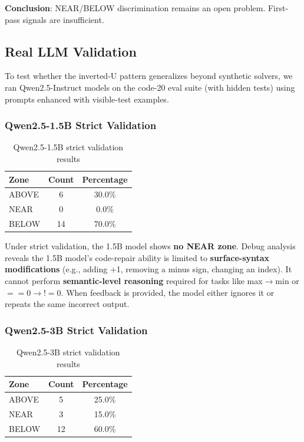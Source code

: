 \documentclass[11pt,a4paper]{article}
\begin{document}
\textbf{Conclusion}: NEAR/BELOW discrimination remains an open problem. First-pass signals are insufficient.

\subsection{Real LLM Validation}

To test whether the inverted-U pattern generalizes beyond synthetic solvers, we ran Qwen2.5-Instruct models on the code-20 eval suite (with hidden tests) using prompts enhanced with visible-test examples.

\subsubsection{Qwen2.5-1.5B Strict Validation}

\begin{table}[h]
\centering
\begin{tabular}{lcc}
\toprule
\textbf{Zone} & \textbf{Count} & \textbf{Percentage} \\
\midrule
ABOVE & 6 & 30.0\% \\
NEAR & 0 & 0.0\% \\
BELOW & 14 & 70.0\% \\
\bottomrule
\end{tabular}
\caption{Qwen2.5-1.5B strict validation results}
\label{tab:1.5b}
\end{table}

Under strict validation, the 1.5B model shows \textbf{no NEAR zone}. Debug analysis reveals the 1.5B model's code-repair ability is limited to \textbf{surface-syntax modifications} (e.g., adding +1, removing a minus sign, changing an index). It cannot perform \textbf{semantic-level reasoning} required for tasks like max$\rightarrow$min or $==0 \rightarrow !=0$. When feedback is provided, the model either ignores it or repeats the same incorrect output.

\subsubsection{Qwen2.5-3B Strict Validation}

\begin{table}[h]
\centering
\begin{tabular}{lcc}
\toprule
\textbf{Zone} & \textbf{Count} & \textbf{Percentage} \\
\midrule
ABOVE & 5 & 25.0\% \\
NEAR & 3 & 15.0\% \\
BELOW & 12 & 60.0\% \\
\bottomrule
\end{tabular}
\caption{Qwen2.5-3B strict validation results}
\label{tab:3b}
\end{table}
\end{document}
